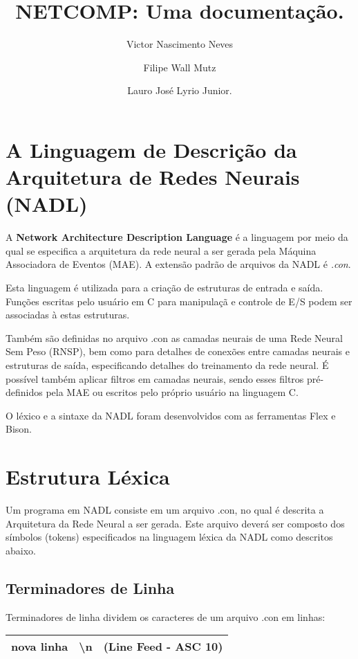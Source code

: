 \documentclass[a4paper,10pt]{article}
\title{NETCOMP: Uma documenta\c{c}\~{a}o.}
\author{Victor Nascimento Neves\and Filipe Wall Mutz\and Lauro Jos\'e Lyrio Junior.}
\begin{document}
\maketitle

\tableofcontents

\section{A Linguagem de Descri\c{c}\~{a}o da Arquitetura de Redes Neurais (NADL)}
A \textbf{Network Architecture Description Language} \'e a linguagem por meio da qual se especifica a arquitetura da rede neural a ser gerada pela M\'aquina Associadora de Eventos (MAE). A extens\~{a}o padr\~{a}o de arquivos da NADL \'e \textit{.con}.

Esta linguagem \'e utilizada para a cria\c{c}\~{a}o de estruturas de entrada e sa\'ida. Fun\c{c}\~{o}es escritas pelo usu\'ario em C para manipula\c{c}\~{a} e controle de E/S podem ser associadas \`{a} estas estruturas.

Tamb\'em s\~ao definidas no arquivo .con as camadas neurais de uma Rede Neural Sem Peso (RNSP), bem como para detalhes de conex\~oes entre camadas neurais e estruturas de sa\'ida, especificando detalhes do treinamento da rede neural. \'E poss\'ivel tamb\'em aplicar filtros em camadas neurais, sendo esses filtros pr\'e-definidos pela MAE ou escritos pelo pr\'oprio usu\'ario na linguagem C.

O l\'exico e a sintaxe da NADL foram desenvolvidos com as ferramentas Flex e Bison.

\section{Estrutura L\'exica}
Um programa em NADL consiste em um arquivo .con, no qual \'e descrita a Arquitetura da Rede Neural a ser gerada. Este arquivo dever\'a ser composto dos s\'imbolos (tokens) especificados na linguagem l\'exica da NADL como descritos abaixo.

	\subsection{Terminadores de Linha}
	Terminadores de linha dividem os caracteres de um arquivo .con em linhas:
	\begin{center}
	 \begin{tabular}{| l | c | r |}
	  \hline
	  nova linha & \textbackslash n & (Line Feed - ASC 10)\\
	  \hline
	 \end{tabular}
	\end{center}
\end{document}
